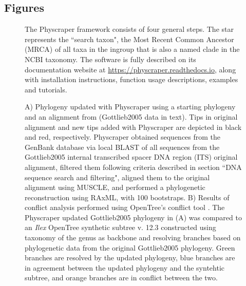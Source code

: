 \documentclass{bmcart}
\begin{document}
\begin{backmatter}
\section*{Figures}
  \begin{figure}[h!]
  \caption{The Physcraper framework consists of four general steps. The star represents
  the ``search taxon", the Most Recent Common Ancestor (MRCA) of all taxa in the
  ingroup that is also a named clade in the NCBI taxonomy. The software is fully
  described on its documentation website at \href{https://physcraper.readthedocs.io}{https://physcraper.readthedocs.io},
  along with installation instructions, function usage descriptions, examples and tutorials.
}
\end{figure}

\begin{figure}[h!]
  \caption{A) Phylogeny updated with Physcraper using a starting phylogeny and an alignment from
  \cite{gottlieb2005molecular} (Gottlieb2005 data in text).
  Tips in original alignment and new tips added with Physcraper are depicted in
  black and red, respectively. Physcraper obtained sequences from the GenBank
  database via local BLAST of all sequences from the Gottlieb2005 internal transcribed
  spacer DNA region (ITS) original alignment,
  filtered them following criteria described in section ``DNA sequence search and
  filtering", aligned them to the original alignment using MUSCLE, and performed a
  phylogenetic reconstruction using RAxML, with 100 bootstraps. B) Results of conflict
  analysis performed using OpenTree's conflict tool \cite{redelings2017supertree}.
  The Physcraper updated Gottlieb2005 phylogeny in (A) was compared to an \textit{Ilex}
  OpenTree synthetic subtree v. 12.3 \cite{ott727571} constructed using taxonomy of the genus
  as backbone and resolving branches based on phylogenetic data from the original
  Gottlieb2005 phylogeny. Green branches are resolved by the updated phylogeny,
  blue branches are in agreement between the updated phylogeny and the syntehtic subtree, and
  orange branches are in conflict between the two.
}
\end{figure}


\end{backmatter}
\end{document}
